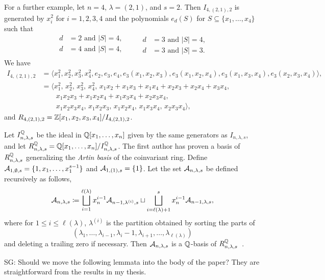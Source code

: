 \documentclass[12pt]{amsart}
\newcommand{\la}{\lambda}
\newcommand{\SG}[1]{{\color{red} SG: #1}}
\begin{document}
For a further example, let $n=4$, $\lambda = (2,1)$, and $s=2$. Then $I_{4,(2,1),2}$ is generated by $x_i^2$ for $i=1,2,3,4$ and the polynomials 
$e_d(S)$ for $S\subseteq \{x_1,\dots, x_4\}$ such that
\begin{equation*}
\begin{aligned}
	d &= 2 \text{ and }|S| = 4,\\
	d &= 4\text{ and }|S| = 4,\\
\end{aligned}
\qquad
\begin{aligned}
	d &= 3\text{ and }|S| = 4,\\
	d &= 3\text{ and }|S| = 3.
\end{aligned}
\end{equation*}
We have
\begin{align*}
    I_{4,(2,1),2} &= \langle x_1^2,x_2^2,x_3^2,x_4^2,e_2,e_3,e_4,e_3(x_1,x_2,x_3),e_3(x_1,x_2,x_4),e_3(x_1,x_3,x_4),e_3(x_2,x_3,x_4)\rangle,\\
    &= \langle x_1^2,\, x_2^2,\, x_3^2,\, x_4^2,\, x_1x_2+x_1x_3+x_1x_4+x_2x_3+x_2x_4+x_3x_4,\\
    &\qquad x_1x_2x_3+x_1x_2x_4+x_1x_3x_4+x_2x_3x_4,\\ 
    &\qquad x_1x_2x_3x_4,\, x_1x_2x_3,\, x_1x_2x_4,\, x_1x_3x_4,\, x_2x_3x_4\rangle,
\end{align*}
and $R_{4,(2,1),2} = \mathbb{Z}[x_1,x_2,x_3,x_4]/I_{4,(2,1),2}$. 

Let $I_{n,\lambda,s}^{\mathbb{Q}}$ be the ideal in $\mathbb{Q}[x_1,\dots,x_n]$ given by the same generators as $I_{n,\lambda,s}$, and let $R_{n,\la,s}^\bQ = \bQ[x_1,\dots, x_n]/I_{n,\lambda,s}^\bQ$. 
The first author has proven a basis of $R_{n,\la,s}^\bQ$ generalizing the \emph{Artin basis} of the coinvariant ring. Define $\mathcal{A}_{1,\emptyset,s} = \{1,x_1,\dots, x_1^{s-1}\}$ and $\mathcal{A}_{1,(1),s} = \{1\}$. Let the set $\cA_{n,\la,s}$ be defined recursively as follows,
\begin{align}
    \cA_{n,\la,s} \coloneqq \bigsqcup_{i=1}^{\ell(\la)} x_n^{i-1} \cA_{n-1,\la^{(i)},s} \sqcup \bigsqcup_{i=\ell(\la)+1}^s x_n^{i-1} \cA_{n-1,\la,s},
\end{align}
where for $1\leq i \leq \ell(\la)$, $\la^{(i)}$ is the partition obtained by sorting the parts of \[(\la_1,\dots, \la_{i-1},\la_i-1,\la_{i+1},\dots, \la_{\ell(\la)})\]
and deleting a trailing zero if necessary.
Then $\cA_{n,\la,s}$ is a $\mathbb{Q}$-basis of $R_{n,\la,s}^\bQ$~\cite[Theorem 3.18]{GriffinOSP}.

\SG{Should we move the following lemmata into the body of the paper? They are straightforward from the results in my thesis.}
\end{document}
